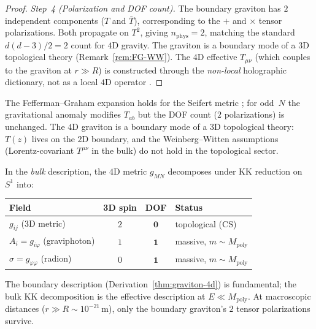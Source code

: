 \begin{proof}
\emph{Step~4 (Polarization and DOF count).}
The boundary graviton has $2$ independent components
($T$ and $\bar T$), corresponding to the $+$ and $\times$
tensor polarizations.
Both propagate on $T^2$, giving $n_{\mathrm{phys}} = 2$, matching
the standard $d(d{-}3)/2 = 2$ count for $4$D gravity.
The graviton is a boundary mode of a $3$D topological
theory (Remark~\ref{rem:FG-WW}).
The $4$D effective $T_{\mu\nu}$ (which couples to the graviton
at $r \gg R$) is constructed through the \emph{non-local}
holographic dictionary, not as a local $4$D operator
\citep{Maldacena1997}.
\end{proof}

\begin{remark}
\label{rem:FG-WW}
The Fefferman--Graham expansion holds for the Seifert metric
\citep{deHaroSolodukhinSkenderis2001, ToldoWillett2018};
for odd~$N$ the gravitational anomaly modifies $T_{ab}$
\citep{KrausLarsen2006} but the DOF count ($2$ polarizations)
is unchanged.
The $4$D graviton is a boundary mode of a $3$D topological
theory: $T(z)$ lives on the $2$D boundary, and the
Weinberg--Witten assumptions (Lorentz-covariant $T^{\mu\nu}$
in the bulk) do not hold in the topological sector.
\end{remark}

\begin{remark}
\label{rmk:kk-dof}
In the \emph{bulk} description, the $4$D metric $g_{MN}$ decomposes
under KK reduction on~$S^1$ into:
\begin{center}
\small
\begin{tabular}{lccl}
\toprule
Field & 3D spin & DOF & Status \\
\midrule
$g_{ij}$ (3D metric) & $2$ & $\mathbf{0}$ & topological (CS) \\
$A_i = g_{i\varphi}$ (graviphoton) & $1$ & $\mathbf{1}$ & massive, $m \sim M_{\mathrm{poly}}$ \\
$\sigma = g_{\varphi\varphi}$ (radion) & $0$ & $\mathbf{1}$ & massive, $m \sim M_{\mathrm{poly}}$ \\
\bottomrule
\end{tabular}
\end{center}
\noindent
The boundary description (Derivation~\ref{thm:graviton-4d})
is fundamental; the bulk KK decomposition is the effective
description at $E \ll M_{\mathrm{poly}}$.
At macroscopic distances ($r \gg R \sim 10^{-21}$\,m),
only the boundary graviton's $2$ tensor polarizations survive.
\end{remark}

